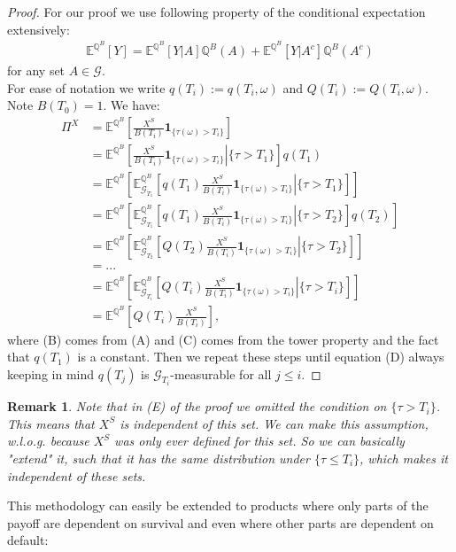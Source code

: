 \documentclass[12pt]{article}
\newtheorem{remark}[theorem]{Remark}
\begin{document}
	\begin{proof} 
		For our proof we use following property of the conditional expectation extensively:
		\begin{align*}
			\mathbb{E}^{\mathbb{Q}^B}\left[Y\right] = \mathbb{E}^{\mathbb{Q}^B}\left[Y | A\right]\mathbb{Q}^B(A) + \mathbb{E}^{\mathbb{Q}^B}\left[Y | A^c\right]\mathbb{Q}^B(A^c) \tag{A}
		\end{align*}
		for any set $A \in \mathcal{G}$.\\
		For ease of notation we write $q(T_i):= q(T_i, \omega)$ and $Q(T_i):= Q(T_i, \omega)$. Note $B(T_0) = 1$. We have:
		\begin{align*}
			\Pi^X &=  \mathbb{E}^{\mathbb{Q}^B}\left[\frac{X^S}{B(T_i)} \mathbf{1}_{\{\tau(\omega) > T_i\}} \right]\\
			&=
			\mathbb{E}^{\mathbb{Q}^B}\left[\left.\frac{X^S}{B(T_i)} \mathbf{1}_{\{\tau(\omega) > T_i\}} \right| \{\tau > T_1\} \right]q(T_1) \tag{B}\\
			&=
			\mathbb{E}^{\mathbb{Q}^B}\left[\mathbb{E}^{\mathbb{Q}^B}_{\mathcal{G}_{T_1}}\left[\left.q(T_1)\frac{X^S}{B(T_i)} \mathbf{1}_{\{\tau(\omega) > T_i\}} \right| \{\tau > T_1\}\right] \right]\tag{C}\\
			&=
			\mathbb{E}^{\mathbb{Q}^B}\left[\mathbb{E}^{\mathbb{Q}^B}_{\mathcal{G}_{T_1}}\left[\left.q(T_1)\frac{X^S}{B(T_i)} \mathbf{1}_{\{\tau(\omega) > T_i\}} \right| \{\tau > T_2\}\right] q(T_2)\right]\\
			&=\mathbb{E}^{\mathbb{Q}^B}\left[\mathbb{E}^{\mathbb{Q}^B}_{\mathcal{G}_{T_2}}\left[\left.Q(T_2)\frac{X^S}{B(T_i)} \mathbf{1}_{\{\tau(\omega) > T_i\}} \right| \{\tau > T_2\}\right] \right]\\
			&=...\\
			&= \mathbb{E}^{\mathbb{Q}^B}\left[\mathbb{E}^{\mathbb{Q}^B}_{\mathcal{G}_{T_i}}\left[\left.Q(T_i)\frac{X^S}{B(T_i)} \mathbf{1}_{\{\tau(\omega) > T_i\}} \right| \{\tau > T_i\}\right] \right] \tag{D}\\
			&= \mathbb{E}^{\mathbb{Q}^B}\left[Q(T_i)\frac{X^S}{B(T_i)}\right],\tag{E}
		\end{align*}
		where (B) comes from (A) and (C) comes from the tower property and the fact that $q(T_1)$ is a constant. Then we repeat these steps until equation (D) always keeping in mind $q(T_j)$ is $\mathcal{G}_{T_i}$-measurable for all $j \le i$.
	\end{proof}
	\begin{remark}
		Note that in (E) of the proof we omitted the condition on $\{\tau > T_i\}$. This means that $X^S$ is independent of this set. We can make this assumption, w.l.o.g. because $X^S$ was only ever defined for this set. So we can basically "extend" it, such that it has the same distribution under $\{\tau \le T_i\}$, which makes it independent of these sets.
	\end{remark}
	This methodology can easily be extended to products where only parts of the payoff are dependent on survival and even where other parts are dependent on default:
	
\end{document}
